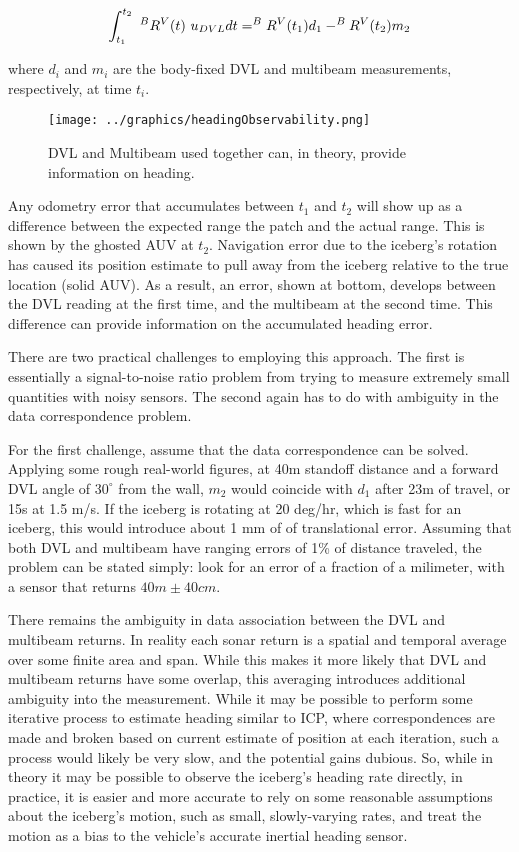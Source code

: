 \begin{align}
\int_{t_1}^{t_2}~^BR^V(t)~u_{\tiny{DVL}}dt = ^BR^V(t_1)d_1 -  ^BR^V(t_2)m_2
\end{align}

where $d_i$ and $m_i$ are the body-fixed DVL and multibeam measurements, respectively, at time $t_i$.

\begin{figure}[h]
   \centering
   \texttt{[image: ../graphics/headingObservability.png]} %
   \caption{DVL and Multibeam used together can, in theory, provide information on heading.}
   \label{fig:headingObservability}
\end{figure}

Any odometry error that accumulates between $t_1$ and $t_2$ will show up as a difference between the expected range the patch and the actual range. This is shown by the ghosted AUV at $t_2$. Navigation error due to the iceberg's rotation has caused its position estimate to pull away from the iceberg relative to the true location (solid AUV). As a result, an error, shown at bottom, develops between the DVL reading at the first time, and the multibeam at the second time. This difference can provide information on the accumulated heading error.

There are two practical challenges to employing this approach. The first is essentially a signal-to-noise ratio problem from trying to measure extremely small quantities with noisy sensors. The second again has to do with ambiguity in the data correspondence problem. 

For the first challenge, assume that the data correspondence can be solved. Applying some rough real-world figures, at 40m standoff distance and a forward DVL angle of $30^\circ$ from the wall, $m_2$ would coincide with $d_1$ after 23m of travel, or 15s at 1.5 m/s. If the iceberg is rotating at 20 deg/hr, which is fast for an iceberg, this would introduce about 1 mm of of translational error. Assuming that both DVL and multibeam have ranging errors of 1\% of distance traveled, the problem can be stated simply: look for an error of a fraction of a milimeter, with a sensor that returns $40m \pm 40 cm$.

There remains the ambiguity in data association between the DVL and multibeam returns. In reality each sonar return is a spatial and temporal average over some finite area and span. While this makes it more likely that DVL and multibeam returns have some overlap, this averaging introduces additional ambiguity into the measurement. While it may be possible to perform some iterative process to estimate heading similar to ICP, where correspondences are made and broken based on current estimate of position at each iteration, such a process would likely be very slow, and the potential gains dubious. So, while in theory it may be possible to observe the iceberg's heading rate directly, in practice, it is easier and more accurate to rely on some reasonable assumptions about the iceberg's motion, such as small, slowly-varying rates, and treat the motion as a bias to the vehicle's accurate inertial heading sensor.


